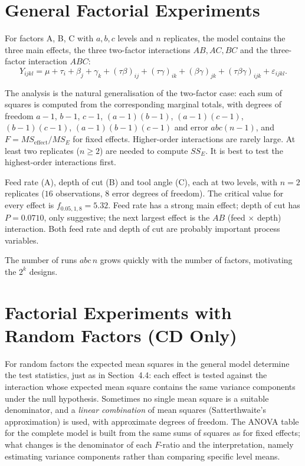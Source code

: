 \section{General Factorial Experiments}

\begin{definition}
For factors A, B, C with $a,b,c$ levels and $n$ replicates, the model contains the three main effects, the three two-factor interactions $AB,AC,BC$ and the three-factor interaction $ABC$:
\[ Y_{ijkl}=\mu+\tau_i+\beta_j+\gamma_k+(\tau\beta)_{ij}+(\tau\gamma)_{ik}+(\beta\gamma)_{jk}+(\tau\beta\gamma)_{ijk}+\varepsilon_{ijkl}. \]
\end{definition}

The analysis is the natural generalisation of the two-factor case: each sum of squares is computed from the corresponding marginal totals, with degrees of freedom $a-1$, $b-1$, $c-1$, $(a-1)(b-1)$, $(a-1)(c-1)$, $(b-1)(c-1)$, $(a-1)(b-1)(c-1)$ and error $abc(n-1)$, and $F=MS_{\text{effect}}/MS_E$ for fixed effects. Higher-order interactions are rarely large. At least two replicates ($n\ge2$) are needed to compute $SS_E$. It is best to test the highest-order interactions first.

\begin{example}
Feed rate (A), depth of cut (B) and tool angle (C), each at two levels, with $n=2$ replicates ($16$ observations, $8$ error degrees of freedom). The critical value for every effect is $f_{0.05,1,8}=5.32$. Feed rate has a strong main effect; depth of cut has $P=0.0710$, only suggestive; the next largest effect is the $AB$ (feed $\times$ depth) interaction. Both feed rate and depth of cut are probably important process variables.
\end{example} The number of runs $abc\,n$ grows quickly with the number of factors, motivating the $2^k$ designs.

\section{Factorial Experiments with Random Factors (CD Only)}

For random factors the expected mean squares in the general model determine the test statistics, just as in Section~4.4: each effect is tested against the interaction whose expected mean square contains the same variance components under the null hypothesis. Sometimes no single mean square is a suitable denominator, and a \emph{linear combination} of mean squares (Satterthwaite's approximation) is used, with approximate degrees of freedom. The ANOVA table for the complete model is built from the same sums of squares as for fixed effects; what changes is the denominator of each $F$-ratio and the interpretation, namely estimating variance components rather than comparing specific level means.

